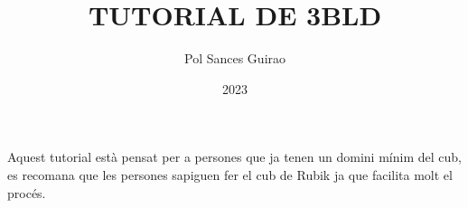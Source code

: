\documentclass{article}
\title{\textbf{TUTORIAL DE 3BLD}}
\author{Pol Sances Guirao}
\date{2023}
\begin{document}
\thispagestyle{empty}
\maketitle
\newpage

\thispagestyle{empty}
\tableofcontents
\newpage

\thispagestyle{empty}
Aquest tutorial està pensat per a persones que ja tenen un domini mínim del cub, es recomana que les persones sapiguen fer el cub de Rubik ja que facilita molt el procés.


\newpage


\newpage


\newpage


\newpage


\newpage

\end{document}
